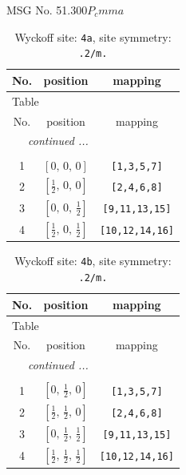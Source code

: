 \documentclass[fleqn,8pt]{jsarticle}
\begin{document}
\setcounter{MaxMatrixCols}{32}

\renewcommand{\tablename}{Table~}
\renewcommand{\figurename}{Figure~}
\begin{center}
\LARGE
MSG No. 51.300\quad$P_{c}mma$
\end{center}
\renewcommand{\arraystretch}{1.2}
\begin{longtable}{ccc}
\caption{Wyckoff site: {\tt 4a}, site symmetry: {\tt .2/m.}}
 \\
 \hline \hline
No. & position & mapping \\ \hline \endfirsthead

\multicolumn{2}{l}{\tablename\ \thetable{}} \\
 \hline \hline
No. & position & mapping \\ \hline \endhead

 \hline \hline
\multicolumn{2}{r}{\footnotesize\it continued ...} \\ \endfoot

 \hline \hline
\multicolumn{2}{r}{} \\ \endlastfoot

1 & $\left[ 0,\, 0,\, 0 \right]$ & {\tt [1,3,5,7]} \\ \hline
2 & $\left[ \frac{1}{2},\, 0,\, 0 \right]$ & {\tt [2,4,6,8]} \\ \hline
3 & $\left[ 0,\, 0,\, \frac{1}{2} \right]$ & {\tt [9,11,13,15]} \\ \hline
4 & $\left[ \frac{1}{2},\, 0,\, \frac{1}{2} \right]$ & {\tt [10,12,14,16]} \\
\end{longtable}
\renewcommand{\arraystretch}{1.2}
\begin{longtable}{ccc}
\caption{Wyckoff site: {\tt 4b}, site symmetry: {\tt .2/m.}}
 \\
 \hline \hline
No. & position & mapping \\ \hline \endfirsthead

\multicolumn{2}{l}{\tablename\ \thetable{}} \\
 \hline \hline
No. & position & mapping \\ \hline \endhead

 \hline \hline
\multicolumn{2}{r}{\footnotesize\it continued ...} \\ \endfoot

 \hline \hline
\multicolumn{2}{r}{} \\ \endlastfoot

1 & $\left[ 0,\, \frac{1}{2},\, 0 \right]$ & {\tt [1,3,5,7]} \\ \hline
2 & $\left[ \frac{1}{2},\, \frac{1}{2},\, 0 \right]$ & {\tt [2,4,6,8]} \\ \hline
3 & $\left[ 0,\, \frac{1}{2},\, \frac{1}{2} \right]$ & {\tt [9,11,13,15]} \\ \hline
4 & $\left[ \frac{1}{2},\, \frac{1}{2},\, \frac{1}{2} \right]$ & {\tt [10,12,14,16]} \\
\end{longtable}
\end{document}
